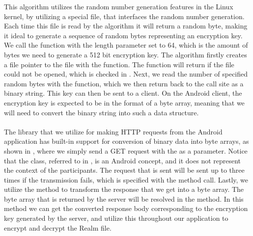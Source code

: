 
\FloatBarrier
{}

This algorithm utilizes the random number generation features in the Linux kernel, by utilizing a special file,  that interfaces the random number generation. Each time this file is read by the algorithm it will return a random byte, making it ideal to generate a sequence of random bytes representing an encryption key. We call the function with the length parameter set to 64, which is the amount of bytes we need to generate a 512 bit encryption key. The algorithm firstly creates a file pointer to the  file with the  function. The function will return  if the file could not be opened, which is checked in . Next, we read the number of specified random bytes with the  function, which we then return back to the call site as a binary string. This key can then be sent to a client. On the Android client, the encryption key is expected to be in the format of a byte array, meaning that we will need to convert the binary string into such a data structure. 
\\\\
The library that we utilize for making HTTP requests from the Android application has built-in support for conversion of binary data into byte arrays, as shown in , where we simply send a GET request with the  as a parameter. Notice that the  class, referred to in , is an Android concept, and it does not represent the context of the participants. The request that is sent will be sent up to three times if the transmission fails, which is specified with the  method call. Lastly, we utilize the  method to transform the response that we get into a byte array. The byte array that is returned by the server will be resolved in the  method. In this method we can get the converted response body corresponding to the encryption key generated by the server, and utilize this throughout our application to encrypt and decrypt the Realm file.


\FloatBarrier

